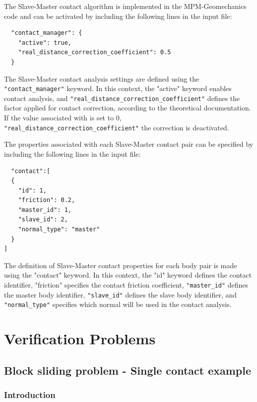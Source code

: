 The Slave-Master contact algorithm is implemented in the MPM-Geomechanics code and can be activated 
by including the following lines in the input file:

\begin{lstlisting}    
  "contact_manager": {
    "active": true,
    "real_distance_correction_coefficient": 0.5
  }
\end{lstlisting}
The Slave-Master contact analysis settings are defined using the \verb|"contact_manager"| keyword. In this context,
the "active" keyword enables contact analysis, and \verb|"real_distance_correction_coefficient"| defines the factor applied 
for contact correction, according to the theoretical documentation. If the value associated with  is set to 0, 
\verb|"real_distance_correction_coefficient"| the correction is deactivated.

The properties associated with each Slave-Master contact pair can be specified by including the following lines in the input file:

\begin{lstlisting}
  "contact":[
  {
    "id": 1,
    "friction": 0.2,
    "master_id": 1,
    "slave_id": 2,
    "normal_type": "master"
  }
]
\end{lstlisting}

The definition of Slave-Master contact properties for each body pair is made using the "contact" keyword. In this context, the "id"
keyword defines the contact identifier, "friction" specifies the contact friction coefficient, \verb|"master_id"| defines the master body 
identifier, \verb|"slave_id"| defines the slave body identifier, and \verb|"normal_type"| specifies which normal will be used in the contact analysis.

\section{Verification Problems}
\label{sec:verification_problems}

\subsection{Block sliding problem - Single contact example}
\label{sec:block_sliding_Slave-Master_contact_example}

\subsubsection*{Introduction}

